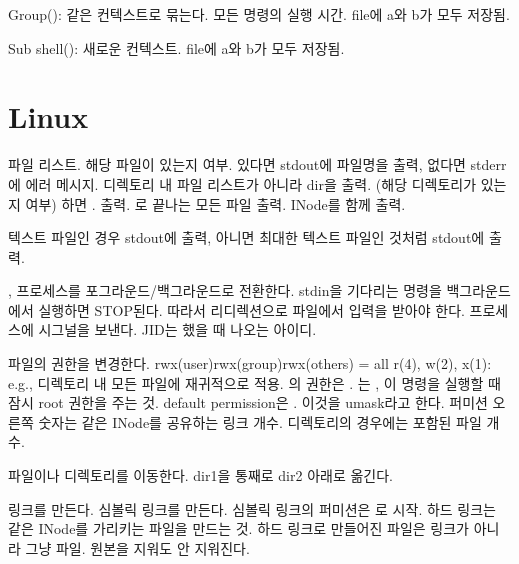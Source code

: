   \itm Group(\code{\{ ;\}}): 같은 컨텍스트로 묶는다.
  \bitmz
    \itm {} \rarr 모든 명령의 실행 시간.
    \itm {} \rarr file에 a와 b가 모두 저장됨.
  \eitmz

  \itm Sub shell(\code{()}): 새로운 컨텍스트.
  \bitmz
    \itm {} \rarr file에 a와 b가 모두 저장됨.
  \eitmz
\eitmz

\section{Linux}

\bitmz
  \itm {} 파일 리스트.
  \bitmz
    \itm {} \rarr 해당 파일이 있는지 여부. 있다면 stdout에 파일명을 출력, 없다면 stderr에 에러 메시지.
    \itm {} \rarr 디렉토리 내 파일 리스트가 아니라 dir을 출력. (해당 디렉토리가 있는지 여부) 하면 . 출력.
    \itm {} \rarr {}로 끝나는 모든 파일 출력.
    \itm {} \rarr INode를 함께 출력.
  \eitmz

  \itm {} 텍스트 파일인 경우 stdout에 출력, 아니면 최대한 텍스트 파일인 것처럼 stdout에 출력.

  \itm {},  프로세스를 포그라운드/백그라운드로 전환한다. stdin을 기다리는 명령을 백그라운드에서 실행하면 STOP된다. 따라서 리디렉션으로 파일에서 입력을 받아야 한다.
  \itm {} 프로세스에 시그널을 보낸다.
  \bitmz
    \itm {}
    \itm {} \rarr JID는 했을 때 나오는 아이디.
  \eitmz

  \itm {} 파일의 권한을 변경한다.
  \bitmz
    \itm rwx(user)rwx(group)rwx(others) = all
    \itm r(4), w(2), x(1): e.g., 
    \itm {} 디렉토리 내 모든 파일에 재귀적으로 적용.
    \itm {}의 권한은 . 는 , 이 명령을 실행할 때 잠시 root 권한을 주는 것.
    \itm default permission은 . 이것을 umask라고 한다.
    \itm 퍼미션 오른쪽 숫자는 같은 INode를 공유하는 링크 개수. 디렉토리의 경우에는 포함된 파일 개수.
  \eitmz

  \itm {} 파일이나 디렉토리를 이동한다.
  \bitmz
    \itm {} \rarr dir1을 통째로 dir2 아래로 옮긴다.
  \eitmz

  \itm {} 링크를 만든다.
  \bitmz
    \itm {} 심볼릭 링크를 만든다. 심볼릭 링크의 퍼미션은 로 시작.
    \itm 하드 링크는 같은 INode를 가리키는 파일을 만드는 것. 하드 링크로 만들어진 파일은 링크가 아니라 그냥 파일. 원본을 지워도 안 지워진다.
  \eitmz


